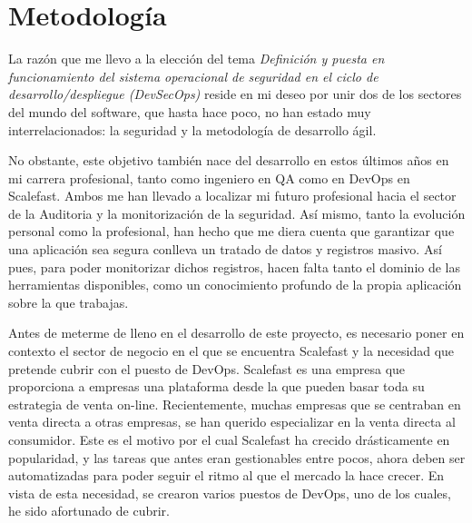 \documentclass[12pt]{report} %
\begin{document}
	














\clearpage
{} %


\chapter{Metodología}


La razón que me llevo a la elección del tema \textit{Definición y puesta en
funcionamiento del sistema operacional de seguridad en el ciclo de
desarrollo/despliegue (DevSecOps)} reside en mi deseo por unir dos de los
sectores del mundo del software, que hasta hace poco, no han estado muy
interrelacionados: la seguridad y la metodología de desarrollo ágil.

No obstante, este objetivo también nace del desarrollo en estos últimos años en
mi carrera profesional, tanto como ingeniero en QA como en DevOps en Scalefast.
Ambos me han llevado a localizar mi futuro profesional hacia el sector de la
Auditoria y la monitorización de la seguridad. Así mismo, tanto la evolución
personal como la  profesional, han hecho que me diera cuenta que garantizar que
una aplicación sea segura conlleva un tratado de datos y registros masivo. Así
pues, para poder monitorizar dichos registros, hacen falta tanto el dominio de
las herramientas disponibles, como un conocimiento profundo de la propia
aplicación sobre la que trabajas.

Antes de meterme de lleno en el desarrollo de este proyecto, es necesario poner
en contexto el sector de negocio en el que se encuentra Scalefast y la necesidad
que pretende cubrir con el puesto de \gls{DevOps}.  Scalefast es una empresa que
proporciona a empresas una plataforma desde la que pueden basar toda su
estrategia de venta on-line.  Recientemente, muchas empresas que se centraban en
venta directa a otras empresas, se han querido especializar en la venta directa
al consumidor.  Este es el motivo por el cual Scalefast ha crecido drásticamente
en popularidad, y las tareas que antes eran gestionables entre pocos, ahora
deben ser automatizadas para poder seguir el ritmo al que el mercado la hace
crecer.  En vista de esta necesidad, se crearon varios puestos de \gls{DevOps},
uno de los cuales, he sido afortunado de cubrir.
\end{document}
